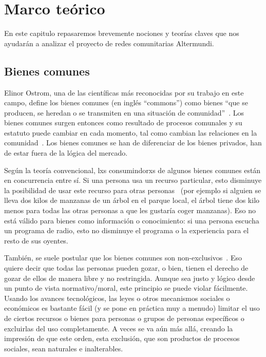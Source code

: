 \section{Marco teórico}

En este capitulo repasaremos brevemente nociones y teorías claves que nos ayudarán a analizar el proyecto de redes comunitarias Altermundi.

\subsection{Bienes comunes}

Elinor Ostrom, una de las científicas más reconocidas por su trabajo en este campo, define los bienes comunes (en inglés ``commons'') como bienes ``que se producen, se heredan o se transmiten en una situación de comunidad''~\autocite{Ostrom1990}.
Los bienes comunes surgen entonces como resultado de procesos comunales y su estatuto puede cambiar en cada momento, tal como cambian las relaciones en la comunidad~\autocite{Harvey2012}.
Los bienes comunes se han de diferenciar de los bienes privados, han de estar fuera de la lógica del mercado.

Según la teoría convencional, lxs consumindorxs de algunos bienes comunes están en concurrencia entre sí.
Si una persona usa un recurso particular, esto disminuye la posibilidad de usar este recurso para otras personas~\autocite[85]{Helfrich2012}
(por ejemplo si alguien se lleva dos kilos de manzanas de un árbol en el parque local, el árbol tiene dos kilo menos para todas las otras personas a que les gustaría coger manzanas).
Eso no está válido para bienes como información o conocimiento: si una persona escucha un programa de radio, esto no disminuye el programa o la experiencia para el resto de sus oyentes.

También, se suele postular que los bienes comunes son non-exclusivos~\autocite[86]{Helfrich2012}.
Eso quiere decir que todas las personas pueden gozar, o bien, tienen el derecho de gozar de ellos de manera libre y no restringida.
Aunque sea justo y lógico desde un punto de vista normativo/moral, este principio se puede violar fácilmente.
Usando los avances tecnológicos, las leyes o otros mecanismos sociales o económicos es bastante fácil (y se pone en práctica muy a menudo) limitar el uso de ciertos recursos o bienes para personas o grupos de personas específicos o excluirlas del uso completamente.
A veces se va aún más allá, creando la impresión de que este orden, esta exclusión, que son productos de procesos sociales, sean naturales e inalterables.

